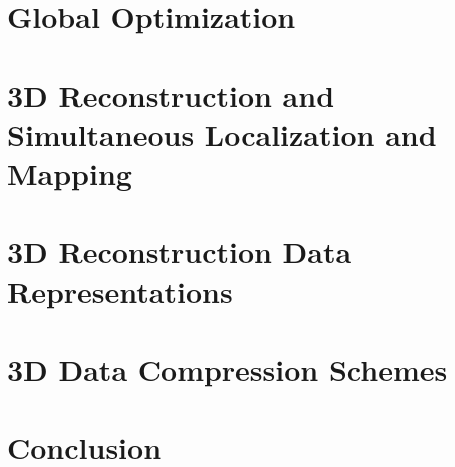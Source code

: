 \section{Global Optimization}



\section{3D Reconstruction and Simultaneous Localization and Mapping}



\section{3D Reconstruction Data Representations}

\section{3D Data Compression Schemes}




\section{Conclusion}

